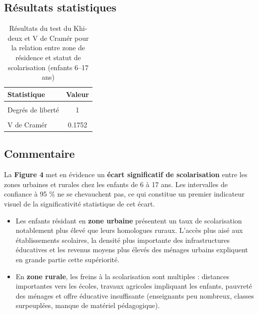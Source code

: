 \documentclass[
  11pt,
]{article}
\providecommand{\tightlist}{%
  \setlength{\itemsep}{0pt}\setlength{\parskip}{0pt}}
\begin{document}
\subsection{Résultats statistiques}\label{ruxe9sultats-statistiques-1}

\begingroup\fontsize{10}{12}\selectfont

\begin{longtable}[t]{lc}
\caption{\label{tab:task11-stats}Résultats du test du Khi-deux et V de Cramér pour la relation entre zone de résidence et statut de scolarisation (enfants 6–17 ans)}\\
\toprule
Statistique & Valeur\\
\midrule
\cellcolor{gray!10}{Khi-deux (χ²)} & \cellcolor{gray!10}{280.566}\\
Degrés de liberté & 1\\
\cellcolor{gray!10}{p-valeur} & \cellcolor{gray!10}{<0.001}\\
V de Cramér & 0.1752\\
\bottomrule
\end{longtable}
\endgroup{}

\subsection{Commentaire}\label{commentaire-3}

La \textbf{Figure 4} met en évidence un \textbf{écart significatif de
scolarisation} entre les zones urbaines et rurales chez les enfants de 6
à 17 ans. Les intervalles de confiance à 95 \% ne se chevauchent pas, ce
qui constitue un premier indicateur visuel de la significativité
statistique de cet écart.

\begin{itemize}
\tightlist
\item
  Les enfants résidant en \textbf{zone urbaine} présentent un taux de
  scolarisation notablement plus élevé que leurs homologues ruraux.
  L'accès plus aisé aux établissements scolaires, la densité plus
  importante des infrastructures éducatives et les revenus moyens plus
  élevés des ménages urbains expliquent en grande partie cette
  supériorité.
\item
  En \textbf{zone rurale}, les freins à la scolarisation sont multiples
  : distances importantes vers les écoles, travaux agricoles impliquant
  les enfants, pauvreté des ménages et offre éducative insuffisante
  (enseignants peu nombreux, classes surpeuplées, manque de matériel
  pédagogique).
\end{itemize}
\end{document}
